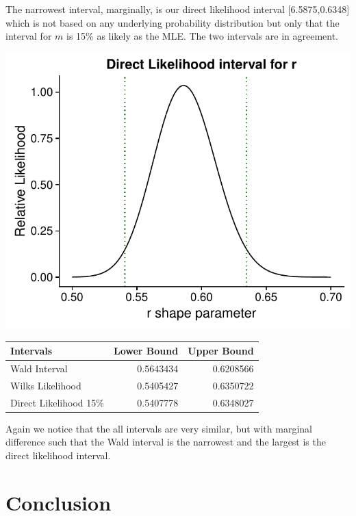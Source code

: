 \documentclass[11pt,preprint, authoryear]{elsarticle}
\let\origtable\table
\let\endorigtable\endtable
\renewenvironment{table}[1][2] {
    \expandafter\origtable\expandafter[H]
} {
    \endorigtable
}
\numberwithin{equation}{section}
\numberwithin{figure}{section}
\numberwithin{table}{section}
\begin{document}
The narrowest interval, marginally, is our direct likelihood interval
{[}6.5875,0.6348{]} which is not based on any underlying probability
distribution but only that the interval for \(m\) is 15\% as likely as
the MLE. The two intervals are in agreement.

\includegraphics{likelihood_files/figure-latex/unnamed-chunk-11-1.pdf}

\begin{table}

\caption{\label{tab:unnamed-chunk-12}Intervals for r parameter}
\centering
\begin{tabular}[t]{lrr}
\toprule
Intervals & Lower Bound & Upper Bound\\
\midrule
Wald Interval & 0.5643434 & 0.6208566\\
Wilks Likelihood & 0.5405427 & 0.6350722\\
Direct Likelihood 15\% & 0.5407778 & 0.6348027\\
\bottomrule
\end{tabular}
\end{table}

Again we notice that the all intervals are very similar, but with
marginal difference such that the Wald interval is the narrowest and the
largest is the direct likelihood interval.

\section{Conclusion}\label{conclusion}
\end{document}
